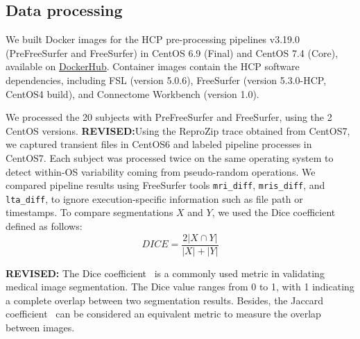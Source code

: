\documentclass[a4paper,num-refs]{oup-contemporary}
\newcommand{\revised}[1]{\color{blue}\textbf{REVISED:}#1\color{black}}
\newcommand{\reprozip}[0]{ReproZip\xspace}
\begin{document}

\subsection{Data processing}

We built Docker images for the HCP pre-processing pipelines v3.19.0
(PreFreeSurfer and FreeSurfer) in CentOS 6.9 (Final) and CentOS 7.4 (Core), available on
\href{https://hub.docker.com/r/bigdatalabteam/hcp-prefreesurfer/}{DockerHub}.
Container images contain the HCP software dependencies, including FSL
(version 5.0.6), FreeSurfer (version 5.3.0-HCP, CentOS4 build), and
Connectome Workbench (version 1.0).

We processed the 20 subjects with PreFreeSurfer and FreeSurfer, using the 2
CentOS versions. 
\revised{Using the \reprozip trace obtained from CentOS7, 
we captured transient files in CentOS6 and labeled pipeline processes in CentOS7.}
Each subject was processed twice on the same operating
system to detect within-OS variability coming from pseudo-random
operations. We compared pipeline results using  FreeSurfer tools \texttt{mri\_diff},
\texttt{mris\_diff}, and \texttt{lta\_diff}, to ignore execution-specific information such as file path or
timestamps. To compare segmentations $X$ and $Y$, we used the Dice coefficient defined as follows:
\[DICE=\frac{2|X \cap Y|}{|X| + |Y|}\]

\revised{
The Dice coefficient~\cite{dice1945measures} is a commonly used metric in validating medical image segmentation.
The Dice value ranges from 0 to 1, with 1 indicating a complete overlap between two segmentation results.
Besides, the Jaccard coefficient~\cite{jaccard1912distribution} can be considered an equivalent metric 
to measure the overlap between images.

}
\end{document}
